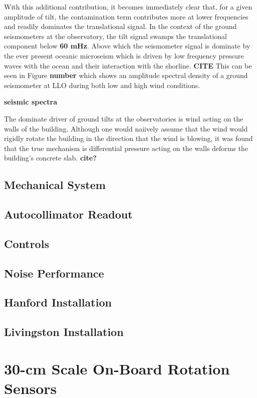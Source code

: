 \documentclass[12pt]{article}
\begin{document}
With this additional contribution, it becomes immediately clear that, for a given amplitude of tilt, the contamination term contributes more at lower frequencies and readily dominates the translational signal. In the context of the ground seismometers at the observatory, the tilt signal swamps the translational component below \textbf{60 mHz}. Above which the seismometer signal is dominate by the ever present oceanic microseism which is driven by low frequency pressure waves with the ocean and their interaction with the shorline. \textbf{CITE} This can be seen in Figure \textbf{number} which shows an amplitude spectral density of a ground seismometer at LLO during both low and high wind conditions.

\textbf{seismic spectra}

The dominate driver of ground tilts at the observatories is wind acting on the walls of the building. Although one would naiively assume that the wind would rigidly rotate the building in the direction that the wind is blowing, it was found that the true mechanism is differential pressure acting on the walls deforms the building's concrete slab. \textbf{cite?} 


\subsection{Mechanical System}
\subsection{Autocollimator Readout}
\subsection{Controls}
\subsection{Noise Performance}
\subsection{Hanford Installation}
\subsection{Livingston Installation}

\section{30-cm Scale On-Board Rotation Sensors}
\end{document}
